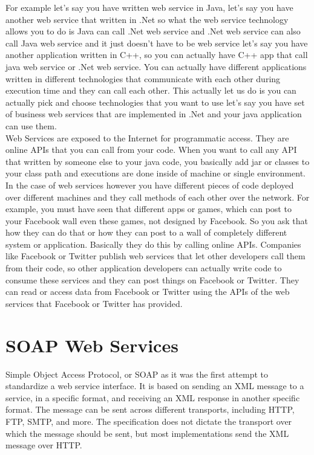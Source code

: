 For example let’s say you have written web service in Java, let’s say you have another web service that written in .Net so what
the web service technology allows you to do is Java can call .Net web service and .Net web service can also call Java web
service and it just doesn’t have to be web service let’s say you have another application written in C++, so you can actually
have C++ app that call java web service or .Net web service. You can actually have different applications written in different
technologies that communicate with each other during execution time and they can call each other. This actually let us do is
you can actually pick and choose technologies that you want to use let’s say you have set of business web services that are
implemented in .Net and your java application can use them.\\

Web Services are exposed to the Internet for programmatic access. They are online APIs that you can call from your code.
When you want to call any API that written by someone else to your java code, you basically add jar or classes to your class
path and executions are done inside of machine or single environment. In the case of web services however you have different
pieces of code deployed over different machines and they call methods of each other over the network. For example, you must
have seen that different apps or games, which can post to your Facebook wall even these games, not designed by Facebook.
So you ask that how they can do that or how they can post to a wall of completely different system or application. Basically
they do this by calling online APIs. Companies like Facebook or Twitter publish web services that let other developers call
them from their code, so other application developers can actually write code to consume these services and they can post
things on Facebook or Twitter. They can read or access data from Facebook or Twitter using the APIs of the web services that
Facebook or Twitter has provided.\\

\section{SOAP Web Services}
\label{section:soa}

Simple Object Access Protocol, or SOAP as it was the first attempt to standardize a web service interface. It is based on
sending an XML message to a service, in a specific format, and receiving an XML response in another specific format.
The message can be sent across different transports, including HTTP, FTP, SMTP, and more. The specification does not
dictate the transport over which the message should be sent, but most implementations send the XML message over HTTP.

